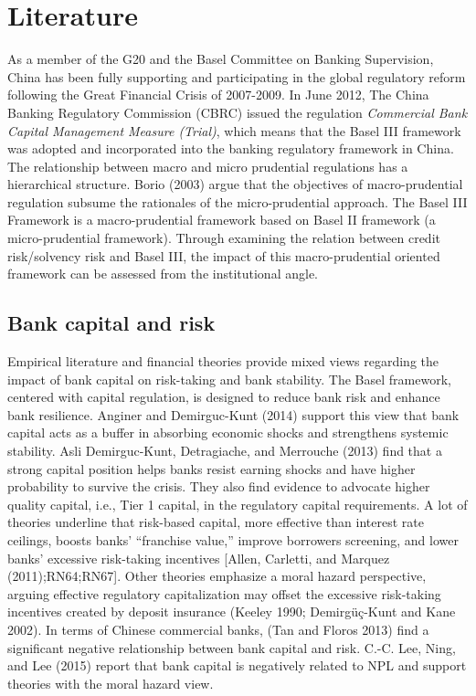\documentclass{article}
\begin{document}
\hypertarget{literature}{%
\section{Literature}\label{literature}}

As a member of the G20 and the Basel Committee on Banking Supervision,
China has been fully supporting and participating in the global
regulatory reform following the Great Financial Crisis of 2007-2009. In
June 2012, The China Banking Regulatory Commission (CBRC) issued the
regulation \emph{Commercial Bank Capital Management Measure (Trial)},
which means that the Basel III framework was adopted and incorporated
into the banking regulatory framework in China. The relationship between
macro and micro prudential regulations has a hierarchical structure.
Borio (2003) argue that the objectives of macro-prudential regulation
subsume the rationales of the micro-prudential approach. The Basel III
Framework is a macro-prudential framework based on Basel II framework (a
micro-prudential framework). Through examining the relation between
credit risk/solvency risk and Basel III, the impact of this
macro-prudential oriented framework can be assessed from the
institutional angle.

\hypertarget{bank-capital-and-risk}{%
\subsection{Bank capital and risk}\label{bank-capital-and-risk}}

Empirical literature and financial theories provide mixed views
regarding the impact of bank capital on risk-taking and bank stability.
The Basel framework, centered with capital regulation, is designed to
reduce bank risk and enhance bank resilience. Anginer and Demirguc-Kunt
(2014) support this view that bank capital acts as a buffer in absorbing
economic shocks and strengthens systemic stability. Asli Demirguc-Kunt,
Detragiache, and Merrouche (2013) find that a strong capital position
helps banks resist earning shocks and have higher probability to survive
the crisis. They also find evidence to advocate higher quality capital,
i.e., Tier 1 capital, in the regulatory capital requirements. A lot of
theories underline that risk-based capital, more effective than interest
rate ceilings, boosts banks' ``franchise value,'' improve borrowers
screening, and lower banks' excessive risk-taking incentives {[}Allen,
Carletti, and Marquez (2011);RN64;RN67{]}. Other theories emphasize a
moral hazard perspective, arguing effective regulatory capitalization
may offset the excessive risk-taking incentives created by deposit
insurance (Keeley 1990; Demirgüç-Kunt and Kane 2002). In terms of
Chinese commercial banks, (Tan and Floros 2013) find a significant
negative relationship between bank capital and risk. C.-C. Lee, Ning,
and Lee (2015) report that bank capital is negatively related to NPL and
support theories with the moral hazard view.
\end{document}
